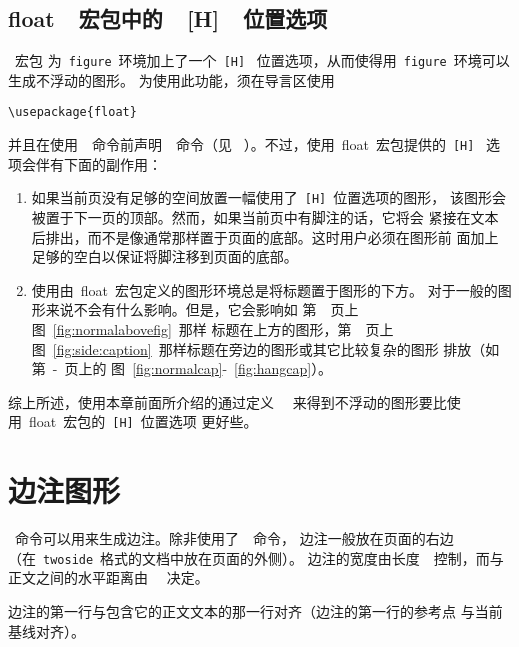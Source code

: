 \subsection{float~~宏包中的~~[H]~~位置选项}

~宏包
为~\texttt{figure}~环境加上了一个~\texttt{[H]}~
位置选项，从而使得用~\texttt{figure}~环境可以生成不浮动的图形。
为使用此功能，须在导言区使用
\begin{Verbatim}[xleftmargin=1cm]
\usepackage{float}
\end{Verbatim}
并且在使用~~命令前声明~~命令（见
~\cite[第~149~页]{Michel}）。不过，使用~\textsf{float}~宏包提供的~\texttt{[H]}~
选项会伴有下面的副作用：
\begin{enumerate}
	\item 如果当前页没有足够的空间放置一幅使用了~\texttt{[H]}~位置选项的图形，
	该图形会被置于下一页的顶部。然而，如果当前页中有脚注的话，它将会
	紧接在文本后排出，而不是像通常那样置于页面的底部。这时用户必须在图形前
	面加上足够的空白以保证将脚注移到页面的底部。
	\item 使用由~\textsf{float}~宏包定义的图形环境总是将标题置于图形的下方。
	对于一般的图形来说不会有什么影响。但是，它会影响如
	第~\pageref{fig:normalabovefig}~页上图~\ref{fig:normalabovefig}~那样
	标题在上方的图形，第~\pageref{fig:side:caption}~页上
	图~\ref{fig:side:caption}~那样标题在旁边的图形或其它比较复杂的图形
	排放（如第~\pageref{fig:normalcap}-\pageref{fig:hangcap}~页上的
	图~\ref{fig:normalcap}-~\ref{fig:hangcap}）。
\end{enumerate}

综上所述，使用本章前面所介绍的通过定义~~
来得到不浮动的图形要比使用~\textsf{float}~宏包的~\texttt{[H]}~位置选项
更好些。

\section{边注图形}\label{sec:marginfigure}

~命令可以用来生成边注。除非使用了~~命令，
边注一般放在页面的右边（在~\texttt{twoside}~格式的文档中放在页面的外侧）。
边注的宽度由长度~~控制，而与正文之间的水平距离由
~~决定。

边注的第一行与包含它的正文文本的那一行对齐（边注的第一行的参考点
与当前基线对齐）。

